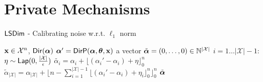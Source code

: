 \documentclass{article}
\begin{document}
\section{Private Mechanisms}

%
%
%
\begin{algorithm}
  \caption{$\mathsf{LSDim}$ - Calibrating noise w.r.t. $\ell_1$ norm}
  \label{lapmech}
  \begin{algorithmic}
  \STATE $\textbf{x}\in\mathcal{X}^n$, $\mathsf{Dir}(\boldsymbol{\alpha})$
  \STATE {} $\boldsymbol{\alpha}' = \mathsf{DirP}(\boldsymbol{\alpha},\boldsymbol{\theta},\textbf{x})$
  \STATE {} a vector $\tilde{\boldsymbol{\alpha}} = (0, \dots, 0 )\in \mathbb{N}^{|\mathcal{X}|}$ 
  \STATE {} $i = 1 \dots |\mathcal{X}| - 1$:
  \STATE \quad {} $\eta \sim \mathsf{Lap}(0, \frac{|\mathcal{X}|}{\epsilon})$
  \STATE \quad \quad  $\tilde{\alpha_i}=\alpha_i + \lfloor{(\alpha_i' - \alpha_i) + \eta}\rfloor^n_0$ 
  \STATE \quad $\tilde{\alpha}_{|\mathcal{X}|} = \alpha_{|\mathcal{X}|} + \lfloor n - \sum_{i = 1}^{|\mathcal{X}|-1}\lfloor{(\alpha_i' - \alpha_i) + \eta_i}\rfloor^n_0 \rfloor^n_0$
   $\tilde{\boldsymbol{\alpha}}$
  \end{algorithmic}
\end{algorithm}
%
%
%
%
%
\end{document}
